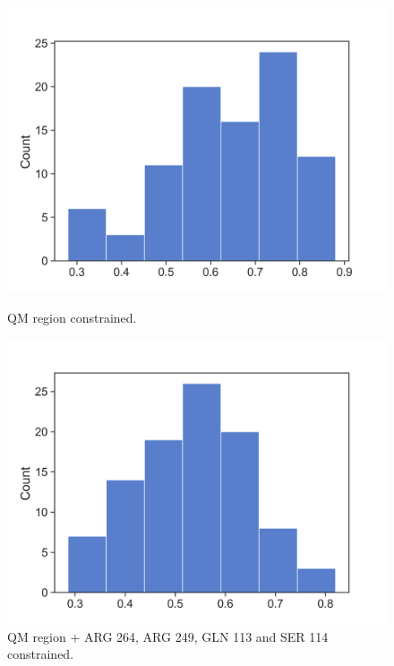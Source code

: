 \documentclass[a4paper,8pt]{beamer}
\begin{document}
%
\begin{frame}
    \begin{figure}[ht]
        \begin{minipage}[b]{0.45\linewidth}
            \centering
            \includegraphics[width=\textwidth]{figures/140.png}
            \caption{QM region constrained.}
            \label{fig:a}
        \end{minipage}
        \hspace{0.5cm}
        \begin{minipage}[b]{0.45\linewidth}
            \centering
            \includegraphics[width=\textwidth]{figures/cons_140.png}
            \caption{QM region $+$ ARG 264, ARG 249, GLN 113 and SER 114 constrained.}
            \label{fig:b}
        \end{minipage}
    \end{figure}
\end{frame}
\end{document}
